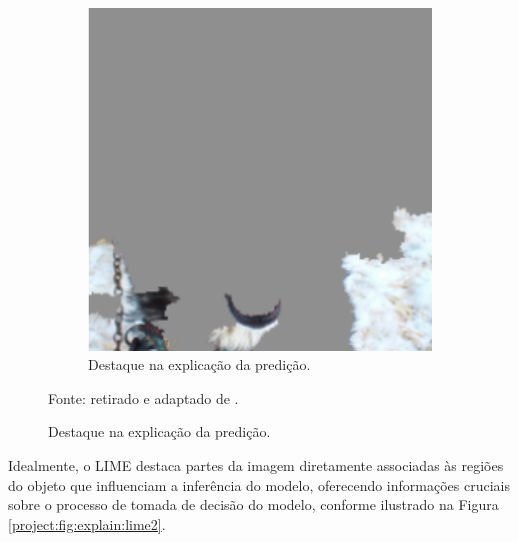 \begin{figure}[H]
\begin{subfigure}[t]{0.45\textwidth}
        \includegraphics[width=1\linewidth]{recursos/imagens/project/fundo_husky.png}
        \caption{Destaque na explicação da predição.}
        \label{project:fig:explain:lime1.2}
    \end{subfigure}%

    Fonte: retirado e adaptado de \cite{Ribeiro2016WhyClassifier}.
\end{figure}

Idealmente, o LIME destaca partes da imagem diretamente associadas às regiões do objeto que influenciam a inferência do modelo, oferecendo informações cruciais sobre o processo de tomada de decisão do modelo, conforme ilustrado na Figura \ref{project:fig:explain:lime2}.

